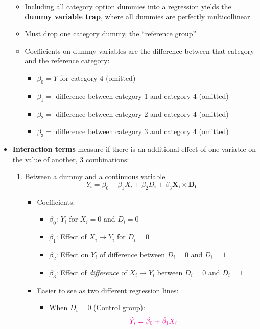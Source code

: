 \documentclass{article}
\begin{document}
\begin{itemize}
\begin{itemize}
		\item Including all category option dummies into a regression yields the \textbf{dummy variable trap}, where all dummies are perfectly multicollinear
		\item Must drop one category dummy, the ``reference group''
		\item Coefficients on dummy variables are the difference between that category and the reference category: 
		\begin{itemize}
			\item $\beta_0=Y$ for category 4 (omitted)
			\item $\beta_1=$ difference between category 1 and category 4 (omitted)
			\item $\beta_2=$ difference between category 2 and category 4 (omitted)
			\item $\beta_3=$ difference between category 3 and category 4 (omitted)
	\end{itemize}
	\end{itemize}
	\item \textbf{Interaction terms} measure if there is an additional effect of one variable on the value of another, 3 combinations:
	\begin{enumerate}
		\item Between a dummy and a continuous variable 
		\begin{equation*}
		Y_i=\beta_0+\beta_1X_i+\beta_2 D_i+\beta_3 \mathbf{X_i \times D_i}
		\end{equation*}
		\begin{itemize}
		\item Coefficients: 
		\begin{itemize}
			\item $\beta_0$: $Y_i$ for $X_i=0$ and $D_i=0$
			\item $\beta_1$: Effect of $X_i \rightarrow Y_i$ for $D_i=0$
			\item $\beta_2$: Effect on $Y_i$ of difference between $D_i=0$ and $D_i=1$
			\item $\beta_3$: Effect of \emph{difference} of $X_i \rightarrow Y_i$ between $D_i=0$ and $D_i=1$
		\end{itemize} 
		\item Easier to see as two different regression lines: 
		\begin{itemize}
		\item When $D_i=0$ (Control group):
			\begin{equation*}
			\textcolor{magenta}{\hat{Y_i} =\hat{\beta_0}+\hat{\beta_1}X_i}

\end{equation*}
\end{itemize}
\end{itemize}
\end{enumerate}
\end{itemize}
\end{document}
